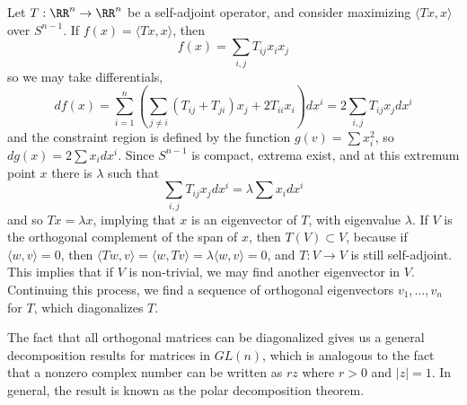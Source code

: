 \begin{example}
    Let $T: \RR^n \to \RR^n$ be a self-adjoint operator, and consider maximizing $\langle Tx, x \rangle$ over $S^{n-1}$. If $f(x) = \langle Tx, x \rangle$, then
    \[ f(x) = \sum_{i,j} T_{ij} x_i x_j \]
    so we may take differentials,
    \[ df(x) = \sum_{i = 1}^n \left( \sum_{j \neq i} (T_{ij} + T_{ji}) x_j + 2 T_{ii} x_i \right) dx^i = 2 \sum_{i,j} T_{ij} x_j dx^i \]
    and the constraint region is defined by the function $g(v) = \sum x_i^2$, so $dg(x) = 2 \sum x_i dx^i$. Since $S^{n-1}$ is compact, extrema exist, and at this extremum point $x$ there is $\lambda$ such that
    \[ \sum_{i,j} T_{ij} x_j dx^i = \lambda \sum x_i dx^i \]
    and so $Tx = \lambda x$, implying that $x$ is an eigenvector of $T$, with eigenvalue $\lambda$. If $V$ is the orthogonal complement of the span of $x$, then $T(V) \subset V$, because if $\langle w, v \rangle = 0$, then $\langle Tw, v \rangle = \langle w, Tv \rangle = \lambda \langle w, v \rangle = 0$, and $T: V \to V$ is still self-adjoint. This implies that if $V$ is non-trivial, we may find another eigenvector in $V$. Continuing this process, we find a sequence of orthogonal eigenvectors $v_1, \dots, v_n$ for $T$, which diagonalizes $T$.
\end{example}

The fact that all orthogonal matrices can be diagonalized gives us a general decomposition results for matrices in $GL(n)$, which is analogous to the fact that a nonzero complex number can be written as $rz$ where $r > 0$ and $|z| = 1$. In general, the result is known as the polar decomposition theorem.

